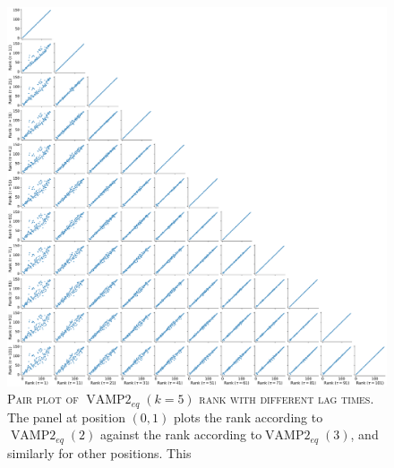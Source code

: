 \documentclass{article}
\begin{document}
\begin{figure}
    \centering
    \includegraphics[width=1.0\textwidth]{figures/vampeq_rank_vs_lag_pairplot_k5.pdf}
    \caption{\textsc{Pair plot of $\operatorname{VAMP2}_{eq}(k=5)$ rank with different lag times.} The panel at position $(0,1)$ plots the rank according to$\operatorname{VAMP2}_{eq}(2)$ against the  rank according to$\operatorname{VAMP2}_{eq}(3)$, and similarly for other positions. This }
    \label{fig:vampeq5_rank_vs_lag_pairplot}
\end{figure}
\end{document}
